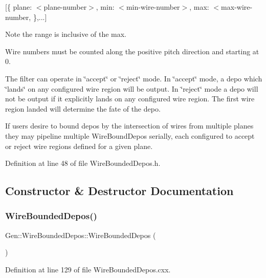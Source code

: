 \mbox{[}\{ plane\+: $<$plane-\/number$>$, min\+: $<$min-\/wire-\/number$>$, max\+: $<$max-\/wire-\/number, \},...\mbox{]}

Note the range is inclusive of the max.

Wire numbers must be counted along the positive pitch direction and starting at 0.

The filter can operate in \char`\"{}accept\char`\"{} or \char`\"{}reject\char`\"{} mode. In \char`\"{}accept\char`\"{} mode, a depo which \char`\"{}lands\char`\"{} on any configured wire region will be output. In \char`\"{}reject\char`\"{} mode a depo will not be output if it explicitly lands on any configured wire region. The first wire region landed will determine the fate of the depo.

If users desire to bound depos by the intersection of wires from multiple planes they may pipeline multiple Wire\+Bound\+Depos serially, each configured to accept or reject wire regions defined for a given plane. 

Definition at line 48 of file Wire\+Bounded\+Depos.\+h.



\subsection{Constructor \& Destructor Documentation}
\mbox{\label{class_wire_cell_1_1_gen_1_1_wire_bounded_depos_a737d91f9772dc3b8fd4d443664daf40f}} 
\subsubsection{\texorpdfstring{Wire\+Bounded\+Depos()}{WireBoundedDepos()}}
{\footnotesize\ttfamily Gen\+::\+Wire\+Bounded\+Depos\+::\+Wire\+Bounded\+Depos (\begin{DoxyParamCaption}{ }\end{DoxyParamCaption})}



Definition at line 129 of file Wire\+Bounded\+Depos.\+cxx.

\mbox{\label{class_wire_cell_1_1_gen_1_1_wire_bounded_depos_a8c9ce3b8edf35e3a814501cb83d8051d}} 
